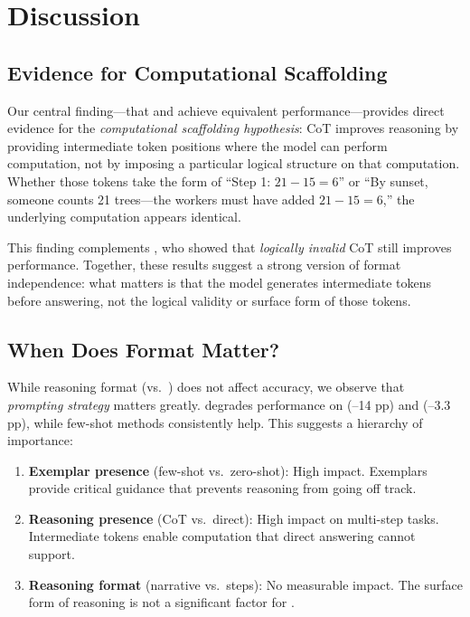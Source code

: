 \section{Discussion}
\label{sec:discussion}

\subsection{Evidence for Computational Scaffolding}
\label{sec:scaffolding}

Our central finding---that \storycot and \fewshotcot achieve equivalent performance---provides direct evidence for the \emph{computational scaffolding hypothesis}: CoT improves reasoning by providing intermediate token positions where the model can perform computation, not by imposing a particular logical structure on that computation. Whether those tokens take the form of ``Step 1: $21 - 15 = 6$'' or ``By sunset, someone counts 21 trees---the workers must have added $21 - 15 = 6$,'' the underlying computation appears identical.

This finding complements \citet{schaeffer2023invalid}, who showed that \emph{logically invalid} CoT still improves performance. Together, these results suggest a strong version of format independence: what matters is that the model generates intermediate tokens before answering, not the logical validity or surface form of those tokens.

\subsection{When Does Format Matter?}
\label{sec:format}

While reasoning format (\storycot vs.\ \fewshotcot) does not affect accuracy, we observe that \emph{prompting strategy} matters greatly. \zeroshotcot degrades performance on \csqa (--14 pp) and \arc (--3.3 pp), while few-shot methods consistently help. This suggests a hierarchy of importance:

\begin{enumerate}[leftmargin=*,itemsep=0pt,topsep=0pt]
\item \textbf{Exemplar presence} (few-shot vs.\ zero-shot): High impact. Exemplars provide critical guidance that prevents reasoning from going off track.
\item \textbf{Reasoning presence} (CoT vs.\ direct): High impact on multi-step tasks. Intermediate tokens enable computation that direct answering cannot support.
\item \textbf{Reasoning format} (narrative vs.\ steps): No measurable impact. The surface form of reasoning is not a significant factor for \gptfour.
\end{enumerate}

